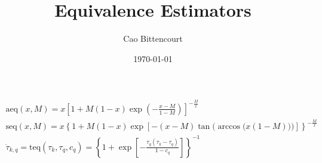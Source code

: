 \documentclass{article}
\title{Equivalence Estimators}
\author{Cao Bittencourt}
\date{\today}
\begin{document}
    \begin{gather}
        \text{aeq}(x,M) = x \left[
            1 + M(1-x)\exp\left(
                -\frac{x-M}{1-M}
            \right)
        \right] ^ {-\frac{M}{x}}\\
        \text{seq}(x,M) = x \left\{ 
            1 + M(1-x)\exp\left[
                -(x-M)
                \tan\bigg(
                    \arccos\big(
                        x(1-M)
                    \big)
                \bigg)
            \right]
        \right\} ^ {-\frac{M}{x}}\\
        \ddot{\tau}_{k,q} = 
        \text{teq}(\tau_{k}, \tau_{q}, c_{q}) = 
        \left\{
            1 + \exp[-
                \frac{
                    \tau_{q}
                    (\tau_{k} - \tau_{q})
                }{
                    1 - c_{q}
                }
            ]
        \right\} ^ {-1}
    \end{gather}
\end{document}
